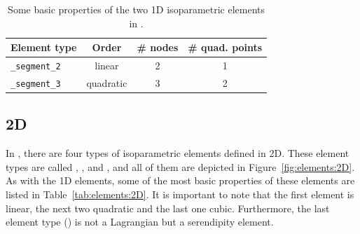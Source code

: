 \begin{table}[!htb]
\begin{center}
\begin{tabular}{l|ccc}
\toprule
Element type & Order & \# nodes & \# quad. points \\
\midrule
\texttt{\_segment\_2} & linear & 2 & 1 \\
\texttt{\_segment\_3} & quadratic & 3 & 2 \\
\bottomrule
\end{tabular}
\end{center}
\caption{Some basic properties of the two 1D isoparametric elements in \akantu.}
\label{tab:elements:1D}
\end{table}

\subsection*{2D}

In \akantu, there are four types of isoparametric elements defined in 2D. These
element types are called , ,
 and , and all of them are depicted
in Figure~\ref{fig:elements:2D}. As with the 1D elements, some of the most basic
properties of these elements are listed in Table~\ref{tab:elements:2D}. It is
important to note that the first element is linear, the next two quadratic and
the last one cubic. Furthermore, the last element type ()
is not a Lagrangian but a serendipity element.

